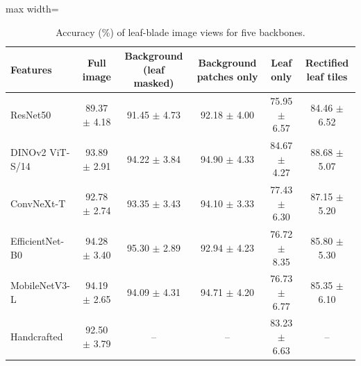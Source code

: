 \begin{table}[tbp]
\centering
\small
\caption{Accuracy (\%) of leaf-blade image views for five backbones.}
\label{tab:audit}
\begin{adjustbox}{max width=\textwidth}
\begin{tabular}{lccccc}
\toprule
Features & Full image & Background (leaf masked) & Background patches only & Leaf only & Rectified leaf tiles \\
\midrule
ResNet50 & 89.37 $\pm$ 4.18 & 91.45 $\pm$ 4.73 & 92.18 $\pm$ 4.00 & 75.95 $\pm$ 6.57 & 84.46 $\pm$ 6.52 \\
DINOv2 ViT-S/14 & 93.89 $\pm$ 2.91 & 94.22 $\pm$ 3.84 & 94.90 $\pm$ 4.33 & 84.67 $\pm$ 4.27 & 88.68 $\pm$ 5.07 \\
ConvNeXt-T & 92.78 $\pm$ 2.74 & 93.35 $\pm$ 3.43 & 94.10 $\pm$ 3.33 & 77.43 $\pm$ 6.30 & 87.15 $\pm$ 5.20 \\
EfficientNet-B0 & 94.28 $\pm$ 3.40 & 95.30 $\pm$ 2.89 & 92.94 $\pm$ 4.23 & 76.72 $\pm$ 8.35 & 85.80 $\pm$ 5.30 \\
MobileNetV3-L & 94.19 $\pm$ 2.65 & 94.09 $\pm$ 4.31 & 94.71 $\pm$ 4.20 & 76.73 $\pm$ 6.77 & 85.35 $\pm$ 6.10 \\
\midrule
Handcrafted & 92.50 $\pm$ 3.79 & -- & -- & 83.23 $\pm$ 6.63 & -- \\
\bottomrule
\end{tabular}
\end{adjustbox}
\end{table}
